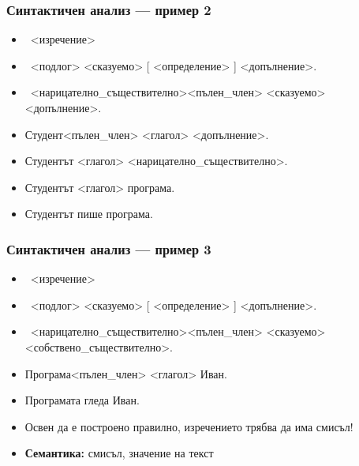 \documentclass[alsotrans]{beamerswitch}
\begin{document}
\begin{frame}
  \frametitle{Синтактичен анализ — пример 2}
  \begin{itemize}[<+->]
  \item\ <изречение>
  \item\ <подлог> <сказуемо> [ <определение> ] <допълнение>\alert.
  \item\ <нарицателно\_съществително><пълен\_член> <сказуемо> <допълнение>\alert.
  \item \alert{Студент}{}<пълен\_член> <глагол> <допълнение>\alert.
  \item \alert{Студентът} <глагол> <нарицателно\_съществително>\alert.
  \item \alert{Студентът} <глагол> \alert{програма.}
  \item \alert{Студентът пише програма.}
  \end{itemize}
\end{frame}

\begin{frame}
  \frametitle{Синтактичен анализ — пример 3}
  \begin{itemize}[<+->]
  \item\ <изречение>
  \item\ <подлог> <сказуемо> [ <определение> ] <допълнение>\alert.
  \item\ <нарицателно\_съществително><пълен\_член> <сказуемо> <собствено\_съществително>\alert.
  \item \alert{Програма}{}<пълен\_член> <глагол> \alert{Иван.}
  \item \alert{Програмата гледа Иван.} \hspace{6em}\onslide<+->%
  \item Освен да е построено правилно, изречението трябва да има смисъл!
  \item \textbf{Семантика:} смисъл, значение на текст
  \end{itemize}
\end{frame}
\end{document}
